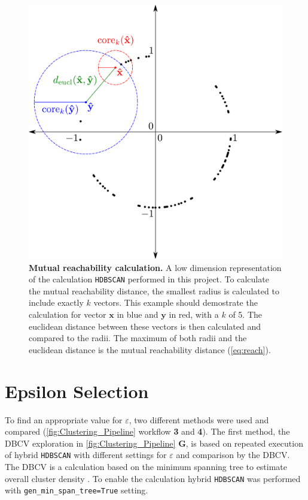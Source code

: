 \begin{figure}[!hbt]
    \centering
    \includegraphics[width=\textwidth]{Graphics/HDB.pdf}
    \caption[Mutual reachability calculation]{\textbf{Mutual reachability calculation.} A low dimension representation of the calculation \texttt{HDBSCAN} performed in this project. To calculate the mutual reachability distance, the smallest radius is calculated to include exactly $k$ vectors. This example should demostrate the calculation for vector $\mathbf{x}$ in blue and $\mathbf{y}$ in red, with a $k$ of 5. The euclidean distance between these vectors is then calculated and compared to the radii. The maximum of both radii and the euclidean distance is the mutual reachability distance (\autoref{eq:reach}).}
    \label{fig:HDB}
\end{figure}

\section{Epsilon Selection} \label{sec:epsilon}

To find an appropriate value for $\varepsilon$, two different methods were used and compared (\autoref{fig:Clustering_Pipeline} workflow \textsf{\textbf{3}} and \textsf{\textbf{4}}). The first method, the \gls{DBCV} exploration in \autoref{fig:Clustering_Pipeline} \textsf{\textbf{G}}, is based on repeated execution of hybrid \texttt{HDBSCAN} with different settings for $\varepsilon$ and comparison by the \gls{DBCV}. The \gls{DBCV} is a calculation based on the minimum spanning tree to estimate overall cluster density \autocite{moulavi_density-based_2014}. To enable the calculation hybrid \texttt{HDBSCAN} was performed with \texttt{gen\_min\_span\_tree=True} setting.

